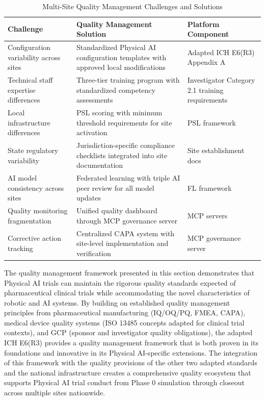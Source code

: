 \begin{table}[H]
\centering
\caption{Multi-Site Quality Management Challenges and Solutions}
\label{tab:multisite-quality}
\small
\begin{tabularx}{\textwidth}{X X X}
\toprule
\textbf{Challenge} & \textbf{Quality Management Solution} & \textbf{Platform Component} \\
\midrule
Configuration variability across sites & Standardized Physical AI configuration templates with approved local modifications & Adapted ICH E6(R3) Appendix A \cite{ich-adapt} \\
Technical staff expertise differences & Three-tier training program with standardized competency assessments & Investigator Category 2.1 training requirements \\
Local infrastructure differences & PSL scoring with minimum threshold requirements for site activation & PSL framework \cite{usl-standard} \\
State regulatory variability & Jurisdiction-specific compliance checklists integrated into site documentation & Site establishment docs \cite{site-docs} \\
AI model consistency across sites & Federated learning with triple AI peer review for all model updates & FL framework \cite{fl-paper} \\
Quality monitoring fragmentation & Unified quality dashboard through MCP governance server & MCP servers \cite{national-mcp-paper} \\
Corrective action tracking & Centralized CAPA system with site-level implementation and verification & MCP governance server \\
\bottomrule
\end{tabularx}
\end{table}

The quality management framework presented in this section demonstrates that
Physical AI trials can maintain the rigorous quality standards expected of
pharmaceutical clinical trials while accommodating the novel characteristics
of robotic and AI systems. By building on established quality management
principles from pharmaceutical manufacturing (IQ/OQ/PQ, FMEA, CAPA), medical
device quality systems (ISO 13485 concepts adapted for clinical trial
contexts), and GCP (sponsor and investigator quality obligations), the adapted
ICH E6(R3) \cite{ich-adapt} provides a quality management framework that is
both proven in its foundations and innovative in its Physical AI-specific
extensions. The integration of this framework with the quality provisions of
the other two adapted standards \cite{cfr50-adapt, cfr312-adapt} and the
national infrastructure \cite{national-mcp-paper, fl-paper} creates a
comprehensive quality ecosystem that supports Physical AI trial conduct from
Phase 0 simulation through closeout across multiple sites nationwide.

